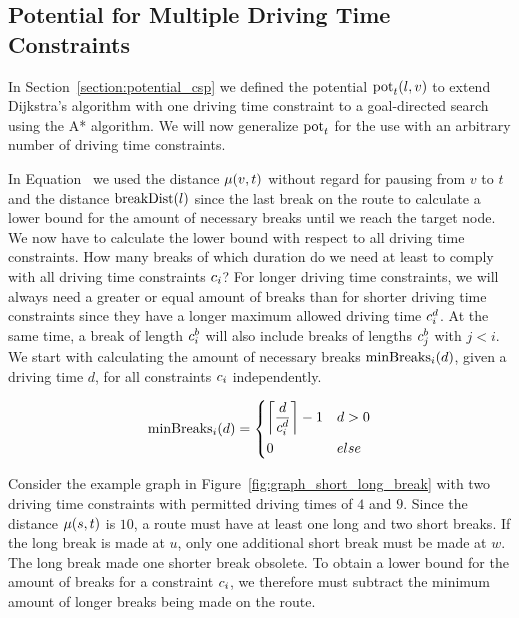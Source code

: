\subsection{Potential for Multiple Driving Time Constraints\label{section:potential_n_csp}}
In Section~\ref{section:potential_csp} we defined the potential $\concretepotential_t(l,v)$ to extend Dijkstra's algorithm with one driving time constraint to a goal-directed search using the A* algorithm. We will now generalize $\concretepotential_t$ for the use with an arbitrary number of driving time constraints.

In Equation~ we used the distance $\distance(v,t)$ without regard for pausing from $v$ to $t$ and the distance $\breakDist(l)$ since the last break on the route to calculate a lower bound for the amount of necessary breaks until we reach the target node. We now have to calculate the lower bound with respect to all driving time constraints. How many breaks of which duration do we need at least to comply with all driving time constraints $\restr_i$? For longer driving time constraints, we will always need a greater or equal amount of breaks than for shorter driving time constraints since they have a longer maximum allowed driving time $\restr_i^d$. At the same time, a break of length $\restr_i^b$ will also include breaks of lengths $\restr_j^b$ with $j < i$. We start with calculating the amount of necessary breaks $\minBreaks_i(d)$, given a driving time $d$, for all constraints $\restr_i$ independently.

\begin{align}\label{eq:min_breaks_n}
	\minBreaks_i(d) = \begin{dcases}
		\ceil*{ \frac{d}{\restr_i^d} } - 1 & d > 0 \\
		0                                  & else
	\end{dcases}
\end{align}

Consider the example graph in Figure~\ref{fig:graph_short_long_break} with two driving time constraints with permitted driving times of $4$ and $9$. Since the distance $\distance(s,t)$ is $10$, a route must have at least one long and two short breaks. If the long break is made at $u$, only one additional short break must be made at $w$. The long break made one shorter break obsolete. To obtain a lower bound for the amount of breaks for a constraint $\restr_i$, we therefore must subtract the minimum amount of longer breaks being made on the route.

